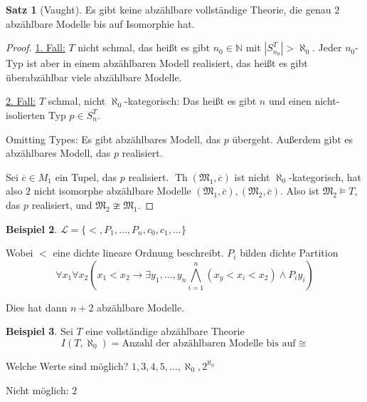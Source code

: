 \documentclass[12pt,parskip=full]{scrartcl}
\newcommand{\setN}{\mathbb{N}}
\newcommand{\abs}[1]{{\left| #1 \right|}}
\newcommand{\heading}{\underline}
\theoremstyle{definition}
\newtheorem{theorem}{Satz}[section]
\newtheorem{example}[theorem]{Beispiel}
\begin{document}
	\begin{theorem}[Vaught]
		Es gibt keine abzählbare vollständige Theorie, die genau $2$ abzählbare Modelle bis auf Isomorphie hat.
	\end{theorem}

	\begin{proof}
		\heading{1. Fall:} $T$ nicht schmal, das heißt es gibt $n_0 \in \setN$ mit $\abs{S_{n_0}^T} > \aleph_0$. Jeder $n_0$-Typ ist aber in einem abzählbaren Modell realisiert, das heißt es gibt überabzählbar viele abzählbare Modelle.
		
		\heading{2. Fall:} $T$ schmal, nicht $\aleph_0$-kategorisch: Das heißt es gibt $n$ und einen nicht-isolierten Typ $p \in S_n^T$.
		
		Omitting Types: Es gibt abzählbares Modell, das $p$ übergeht. Außerdem gibt es abzählbares Modell, das $p$ realisiert.
		
		Sei $\overline{c} \in M_1$ ein Tupel, das $p$ realisiert. $\operatorname{Th}(\mathfrak{M}_1, \overline{c})$ ist nicht $\aleph_0$-kategorisch, hat also $2$ nicht isomorphe abzählbare Modelle $(\mathfrak{M}_1, \overline{c}), (\mathfrak{M}_2, \overline{c})$. Also ist $\mathfrak{M}_2 \models T$, das $p$ realisiert, und $\mathfrak{M}_2 \ncong \mathfrak{M}_1$.
	\end{proof}

	\begin{example}
		$\mathcal{L} = \{ <, P_1, \dots, P_n, c_0, c_1, \dots \}$
		
		Wobei $<$ eine dichte lineare Ordnung beschreibt. $P_i$ bilden dichte Partition
		\begin{equation*}
			\forall x_1 \forall x_2 (x_1 < x_2 \rightarrow \exists y_1, \dots, y_n \bigwedge_{i=1}^n (x_y < x_i < x_2) \land P_i y_i)
		\end{equation*}
		
		Dies hat dann $n+2$ abzählbare Modelle.
	\end{example}

	\begin{example}
		Sei $T$ eine vollständige abzählbare Theorie
		\begin{equation*}
			I(T, \aleph_0) = \text{Anzahl der abzählbaren Modelle bis auf} \cong
		\end{equation*}
	\end{example}

	Welche Werte sind möglich? $1,3,4,5, \dots, \aleph_0, 2^{\aleph_0}$
	
	Nicht möglich: $2$
	
\end{document}
